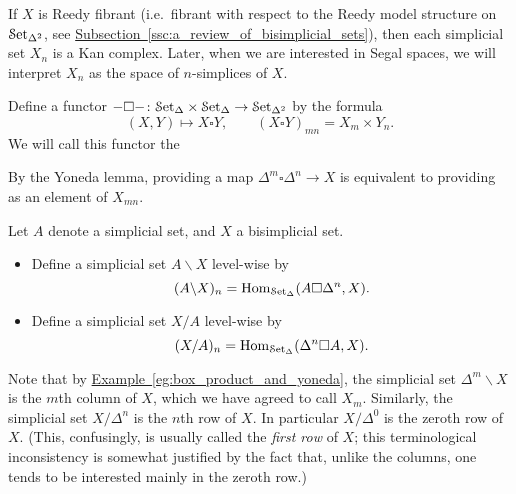 \documentclass[main.tex]{subfiles}
\begin{document}
If $X$ is Reedy fibrant (i.e.\ fibrant with respect to the Reedy model structure on $\mathcal{S}\mathrm{et}_{\Delta^{2}}$, see \hyperref[ssc:a_review_of_bisimplicial_sets]{Subsection~\ref*{ssc:a_review_of_bisimplicial_sets}}), then each simplicial set $X_{n}$ is a Kan complex. Later, when we are interested in Segal spaces, we will interpret $X_{n}$ as the space of $n$-simplices of $X$.

\begin{definition}
  Define a functor $- \square -\colon \mathcal{S}\mathrm{et}_{\Delta} \times \mathcal{S}\mathrm{et}_{\Delta} \to \mathcal{S}\mathrm{et}_{\Delta^{2}}$ by the formula
  \begin{equation*}
    (X, Y) \mapsto X \square Y,\qquad (X \square Y)_{mn} = X_{m} \times Y_{n}.
  \end{equation*}
  We will call this functor the 
\end{definition}

\begin{example}
  \label{eg:box_product_and_yoneda}
  By the Yoneda lemma, providing a map $\Delta^{m} \square \Delta^{n} \to X$ is equivalent to providing as an element of $X_{mn}$.
\end{example}

\begin{definition}
  \label{def:left_and_right_divison_functors}
  Let $A$ denote a simplicial set, and $X$ a bisimplicial set.
  \begin{itemize}
    \item Define a simplicial set $A \backslash X$ level-wise by
      \begin{equation*}
        (A \backslash X)_{n} = \mathrm{Hom}_{\mathcal{S}\mathrm{et}_{\Delta}}(A \square \Delta^{n}, X).
      \end{equation*}

    \item Define a simplicial set $X / A$ level-wise by
      \begin{equation*}
        (X / A)_{n} = \mathrm{Hom}_{\mathcal{S}\mathrm{et}_{\Delta}}(\Delta^{n} \square A, X).
      \end{equation*}
  \end{itemize}
\end{definition}

Note that by \hyperref[eg:box_product_and_yoneda]{Example~\ref*{eg:box_product_and_yoneda}}, the simplicial set $\Delta^{m} \backslash X$ is the $m$th column of $X$, which we have agreed to call $X_{m}$. Similarly, the simplicial set $X / \Delta^{n}$ is the $n$th row of $X$. In particular $X / \Delta^{0}$ is the zeroth row of $X$. (This, confusingly, is usually called the \emph{first row} of $X$; this terminological inconsistency is somewhat justified by the fact that, unlike the columns, one tends to be interested mainly in the zeroth row.)
\end{document}
